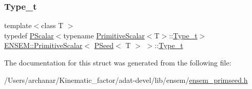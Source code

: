 \subsubsection{\texorpdfstring{Type\_t}{Type\_t}\hspace{0.1cm}{\footnotesize\ttfamily [3/3]}}
{\footnotesize\ttfamily template$<$class T $>$ \\
typedef \mbox{\hyperlink{classENSEM_1_1PScalar}{P\+Scalar}}$<$typename \mbox{\hyperlink{structENSEM_1_1PrimitiveScalar}{Primitive\+Scalar}}$<$T$>$\+::\mbox{\hyperlink{structENSEM_1_1PrimitiveScalar_3_01PSeed_3_01T_01_4_01_4_a222ab5cf9af822b8b516473da4b5a787}{Type\+\_\+t}}$>$ \mbox{\hyperlink{structENSEM_1_1PrimitiveScalar}{E\+N\+S\+E\+M\+::\+Primitive\+Scalar}}$<$ \mbox{\hyperlink{classENSEM_1_1PSeed}{P\+Seed}}$<$ T $>$ $>$\+::\mbox{\hyperlink{structENSEM_1_1PrimitiveScalar_3_01PSeed_3_01T_01_4_01_4_a222ab5cf9af822b8b516473da4b5a787}{Type\+\_\+t}}}



The documentation for this struct was generated from the following file\+:\begin{DoxyCompactItemize}
\item 
/\+Users/archanar/\+Kinematic\+\_\+factor/adat-\/devel/lib/ensem/\mbox{\hyperlink{adat-devel_2lib_2ensem_2ensem__primseed_8h}{ensem\+\_\+primseed.\+h}}\end{DoxyCompactItemize}
